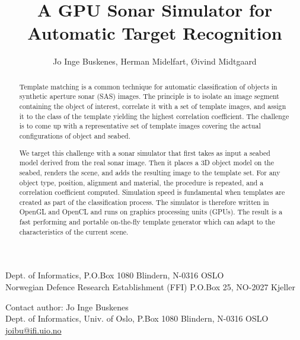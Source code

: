 \documentclass[
   UAM                                          %
 , 12pt                                         %
 , bibtex                                       %
 , layout
]{common/mytemplate}
\begin{document}
% 

\pagestyle{plain}



\title{A GPU Sonar Simulator for Automatic Target Recognition}%
%
\author{Jo Inge Buskenes\firstAddress, Herman Midelfart\secondAddress, \O{}ivind Midtgaard\secondAddress}%
%
\begin{contact}
  \firstAddress Dept. of Informatics, P.O.Box 1080 Blindern, N-0316 OSLO\\
  \secondAddress Norwegian Defence Research Establishment (FFI) P.O.Box 25, NO-2027 Kjeller
\end{contact}%
%
\begin{contact}
Contact author: Jo Inge Buskenes\\
Dept. of Informatics, Univ. of Oslo, P.Box 1080 Blindern, N-0316 OSLO\\
\href{mailto:joibu@ifi.uio.no}{joibu@ifi.uio.no}
\end{contact}%
%
\begin{abstract}
Template matching is a common technique for automatic classification of objects in synthetic aperture sonar (SAS) images. The principle is to isolate an image segment containing the object of interest, correlate it with a set of template images, and assign it to the class of the template yielding the highest correlation coefficient. The challenge is to come up with a representative set of template images covering the actual configurations of object and seabed.

We target this challenge with a sonar simulator that first takes as input a seabed model derived from the real sonar image. Then it places a 3D object model on the seabed, renders the scene, and adds the resulting image to the template set. For any object type, position, alignment and material, the procedure is repeated, and a correlation coefficient computed. Simulation speed is fundamental when templates are created as part of the classification process. The simulator is therefore written in OpenGL and OpenCL and runs on graphics processing units (GPUs). The result is a fast performing and portable on-the-fly template generator which can adapt to the characteristics of the current scene.
\end{abstract}%
%
\end{document}

